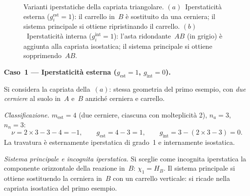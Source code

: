 \begin{esempio}
\begin{svolgimento}
\begin{figure}[htbp]
			\caption{Varianti iperstatiche della capriata triangolare.
				$(a)$~Iperstaticità esterna ($g_i^{\text{est}} = 1$):
				il carrello in~$B$ è sostituito da una cerniera;
				il sistema principale si ottiene ripristinando
				il carrello.
				$(b)$~Iperstaticità interna ($g_i^{\text{int}} = 1$):
				l'asta ridondante~$AB$ (in grigio) è aggiunta
				alla capriata isostatica; il sistema principale
				si ottiene sopprimendo~$AB$.}
			\label{fig:capriata_iperstatica}
		\end{figure}
		
		\noindent\textbf{Caso~1 --- Iperstaticità esterna
			($g_\text{est} = 1$, $g_\text{int} = 0$).}
		
		Si considera la capriata della \,$(a)$:
		stessa geometria del primo esempio, con \emph{due cerniere}
		al suolo in~$A$ e~$B$ anziché cerniera e carrello.
		
		\smallskip
		\noindent\textit{Classificazione.}
		$m_\text{est} = 4$ (due cerniere, ciascuna con
		molteplicità 2), $n_a = 3$, $n_n = 3$:
		\[
		\nu = 2 \times 3 - 3 - 4 = -1,
		\qquad
		g_\text{est} = 4 - 3 = 1,
		\qquad
		g_\text{int} = 3 - (2 \times 3 - 3) = 0.
		\]
		La travatura è esternamente iperstatica di grado~1
		e internamente isostatica.
		
		\smallskip
		\noindent\textit{Sistema principale e incognita
			iperstatica.}
		Si sceglie come incognita iperstatica la componente
		orizzontale della reazione in~$B$: $\chi_1 = H_B$.
		Il sistema principale si ottiene sostituendo la
		cerniera in~$B$ con un carrello verticale: si
		ricade nella capriata isostatica del primo esempio.
		

\end{svolgimento}
\end{esempio}
